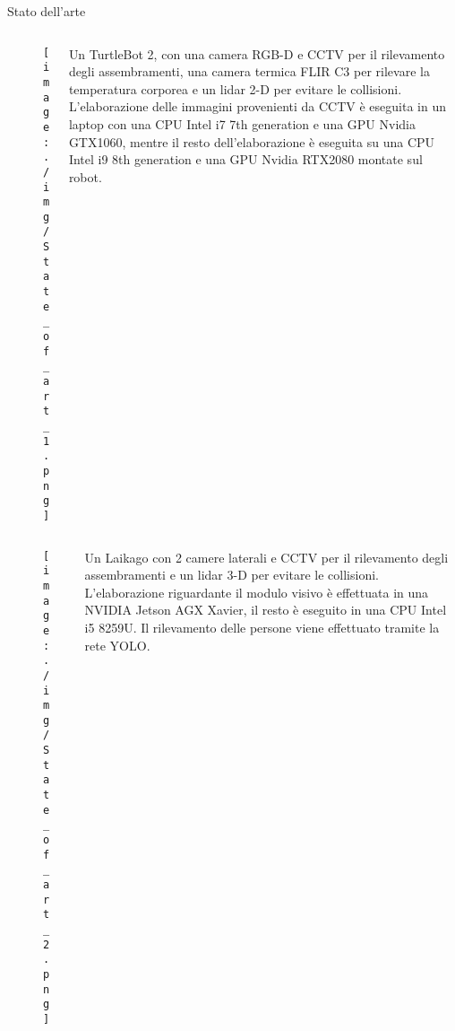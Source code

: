 \documentclass[aspectratio=169, leqno]{beamer}
\begin{document}
	\begin{frame}[allowframebreaks]{Stato dell'arte}
		\begin{columns}
			\begin{column}{0.5\textwidth}
				\begin{figure}[H]
				\centering
				\texttt{[image: ./img/State\_of\_art\_1.png]}
			\end{figure}
			\end{column}
			
			\begin{column}{0.5\textwidth}
				\justifying
				Un TurtleBot 2, con una camera RGB-D e CCTV per il rilevamento
				degli assembramenti, una camera termica FLIR C3 per rilevare la
				temperatura corporea e un lidar 2-D per evitare le collisioni.
				L'elaborazione delle immagini provenienti da CCTV è eseguita in un
				laptop con una CPU Intel i7 7th generation e una GPU Nvidia
				GTX1060, mentre il resto dell'elaborazione è eseguita su una CPU
				Intel i9 8th generation e una GPU Nvidia RTX2080 montate sul robot.
			\end{column}
			
		\end{columns}
	
	\framebreak
	
	\begin{columns}
		\begin{column}{0.5\linewidth}
			\begin{figure}[H]
				\centering
				\texttt{[image: ./img/State\_of\_art\_2.png]}
			\end{figure}
		\end{column}

		\begin{column}{0.5\linewidth}
		\justifying
			Un Laikago con 2 camere laterali e CCTV per il rilevamento degli
			assembramenti e un lidar 3-D per evitare le collisioni.
			L'elaborazione riguardante il modulo visivo è effettuata in una
			NVIDIA Jetson AGX Xavier, il resto è eseguito in una CPU Intel i5
			8259U. Il rilevamento delle persone viene effettuato tramite la
			rete YOLO.
		\end{column}
	\end{columns}
	
	\end{frame}
	
\end{document}
